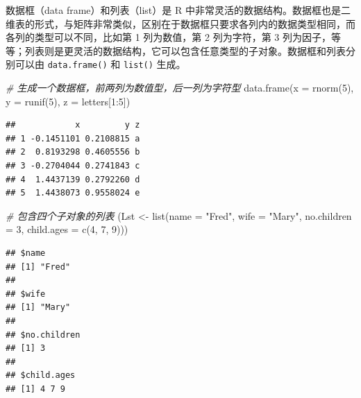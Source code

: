 \documentclass[
  b5paper,
  UTF8,twoside]{book}
\newenvironment{Shaded}{\begin{snugshade}}{\end{snugshade}}
\newcommand{\AttributeTok}[1]{\textcolor[rgb]{0.77,0.63,0.00}{#1}}
\newcommand{\CommentTok}[1]{\textcolor[rgb]{0.56,0.35,0.01}{\textit{#1}}}
\newcommand{\DecValTok}[1]{\textcolor[rgb]{0.00,0.00,0.81}{#1}}
\newcommand{\FunctionTok}[1]{\textcolor[rgb]{0.00,0.00,0.00}{#1}}
\newcommand{\NormalTok}[1]{#1}
\newcommand{\OtherTok}[1]{\textcolor[rgb]{0.56,0.35,0.01}{#1}}
\newcommand{\SpecialCharTok}[1]{\textcolor[rgb]{0.00,0.00,0.00}{#1}}
\newcommand{\StringTok}[1]{\textcolor[rgb]{0.31,0.60,0.02}{#1}}
\begin{document}
数据框（data frame）和列表（list）是 R 中非常灵活的数据结构。数据框也是二维表的形式，与矩阵非常类似，区别在于数据框只要求各列内的数据类型相同，而各列的类型可以不同，比如第 1 列为数值，第 2 列为字符，第 3 列为因子，等等；列表则是更灵活的数据结构，它可以包含任意类型的子对象。数据框和列表分别可以由 \texttt{data.frame()} 和 \texttt{list()} 生成。

\begin{Shaded}
\begin{Highlighting}[]
\CommentTok{\# 生成一个数据框，前两列为数值型，后一列为字符型}
\FunctionTok{data.frame}\NormalTok{(}\AttributeTok{x =} \FunctionTok{rnorm}\NormalTok{(}\DecValTok{5}\NormalTok{), }\AttributeTok{y =} \FunctionTok{runif}\NormalTok{(}\DecValTok{5}\NormalTok{), }\AttributeTok{z =}\NormalTok{ letters[}\DecValTok{1}\SpecialCharTok{:}\DecValTok{5}\NormalTok{])}
\end{Highlighting}
\end{Shaded}

\begin{verbatim}
##            x         y z
## 1 -0.1451101 0.2108815 a
## 2  0.8193298 0.4605556 b
## 3 -0.2704044 0.2741843 c
## 4  1.4437139 0.2792260 d
## 5  1.4438073 0.9558024 e
\end{verbatim}

\begin{Shaded}
\begin{Highlighting}[]
\CommentTok{\# 包含四个子对象的列表}
\NormalTok{(Lst }\OtherTok{\textless{}{-}} \FunctionTok{list}\NormalTok{(}\AttributeTok{name =} \StringTok{"Fred"}\NormalTok{, }\AttributeTok{wife =} \StringTok{"Mary"}\NormalTok{, }\AttributeTok{no.children =} \DecValTok{3}\NormalTok{, }\AttributeTok{child.ages =} \FunctionTok{c}\NormalTok{(}\DecValTok{4}\NormalTok{, }\DecValTok{7}\NormalTok{, }\DecValTok{9}\NormalTok{)))}
\end{Highlighting}
\end{Shaded}

\begin{verbatim}
## $name
## [1] "Fred"
## 
## $wife
## [1] "Mary"
## 
## $no.children
## [1] 3
## 
## $child.ages
## [1] 4 7 9
\end{verbatim}

\begin{Shaded}
\end{Shaded}
\end{document}
